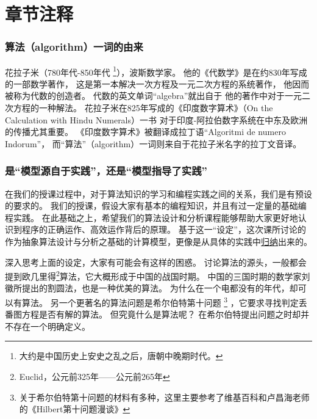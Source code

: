 

\section*{章节注释}

\subsubsection{算法（algorithm）一词的由来}

花拉子米（780年代-850年代
    \footnote{大约是中国历史上安史之乱之后，唐朝中晚期时代。}），波斯数学家。
他的《代数学》是在约830年写成的一部数学著作，
    这是第一本解决一次方程及一元二次方程的系统著作，
    他因而被称为代数的创造者。
代数的英文单词“algebra”就出自于
    他的著作中对于一元二次方程的一种解法。
花拉子米在825年写成的《印度数字算术》（On the Calculation with Hindu Numerals）一书
    对于印度-阿拉伯数字系统在中东及欧洲的传播尤其重要。
《印度数字算术》被翻译成拉丁语“Algoritmi de numero Indorum”，
    而“算法”（algorithm）一词则来自于花拉子米名字的拉丁文音译。

\subsubsection{是“模型源自于实践”，还是“模型指导了实践”}

在我们的授课过程中，对于算法知识的学习和编程实践之间的关系，我们是有预设的要求的。
我们的授课，假设大家有基本的编程知识，并且有过一定量的基础编程实践。
在此基础之上，希望我们的算法设计和分析课程能够帮助大家更好地认识到程序的正确运作、高效运作背后的原理。
基于这一“设定”，这次课所讨论的作为抽象算法设计与分析之基础的计算模型，更像是从具体的实践中\ul{归纳}出来的。

深入思考上面的设定，大家有可能会有这样的困惑。
讨论算法的源头，一般都会提到欧几里得\footnote{Euclid，公元前325年——公元前265年}算法，它大概形成于中国的战国时期。
中国的三国时期的数学家刘徽所提出的割圆法，也是一种优美的算法。
为什么在一个电都没有的年代，却可以有算法。
另一个更著名的算法问题是希尔伯特第十问题
    \footnote{关于希尔伯特第十问题的材料有多种，这里主要参考了维基百科和卢昌海老师的《Hilbert第十问题漫谈》}
    ，它要求寻找判定丢番图方程是否有解的算法。
但究竟什么是算法呢？ 在希尔伯特提出问题之时却并不存在一个明确定义。 

